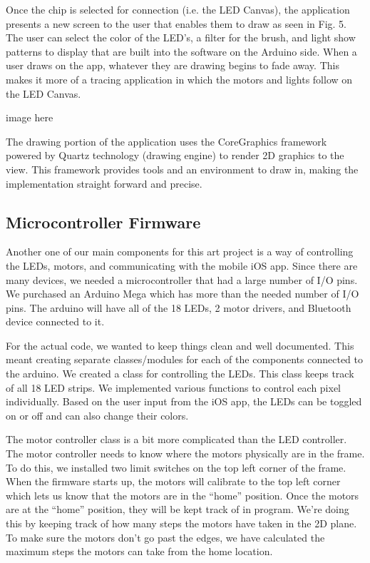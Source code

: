 \documentclass[12pt]{article}
\begin{document}
Once the chip is selected for connection (i.e. the LED Canvas), the application presents a new screen to the user that enables them to draw as seen in Fig. 5. The user can select the color of the LED’s, a filter for the brush, and light show patterns to display that are built into the software on the Arduino side. When a user draws on the app, whatever they are drawing begins to fade away. This makes it more of a tracing application in which the motors and lights follow on the LED Canvas.

image here

The drawing portion of the application uses the CoreGraphics framework powered by Quartz technology (drawing engine) to render 2D graphics to the view. This framework provides tools and an environment to draw in, making the implementation straight forward and precise.

\subsection{Microcontroller Firmware}
Another one of our main components for this art project is a way of controlling the LEDs, motors, and communicating with the mobile iOS app. Since there are many devices, we needed a microcontroller that had a large number of I/O pins. We purchased an Arduino Mega which has more than the needed number of I/O pins. The arduino will have all of the 18 LEDs, 2 motor drivers, and Bluetooth device connected to it.

For the actual code, we wanted to keep things clean and well documented. This meant creating separate classes/modules for each of the components connected to the arduino. We created a class for controlling the LEDs. This class keeps track of all 18 LED strips. We implemented various functions to control each pixel individually. Based on the user input from the iOS app, the LEDs can be toggled on or off and can also change their colors.

The motor controller class is a bit more complicated than the LED controller. The motor controller needs to know where the motors physically are in the frame. To do this, we installed two limit switches on the top left corner of the frame. When the firmware starts up, the motors will calibrate to the top left corner which lets us know that the motors are in the “home” position. Once the motors are at the “home” position, they will be kept track of in program. We’re doing this by keeping track of how many steps the motors have taken in the 2D plane. To make sure the motors don’t go past the edges, we have calculated the maximum steps the motors can take from the home location. 
\end{document}
